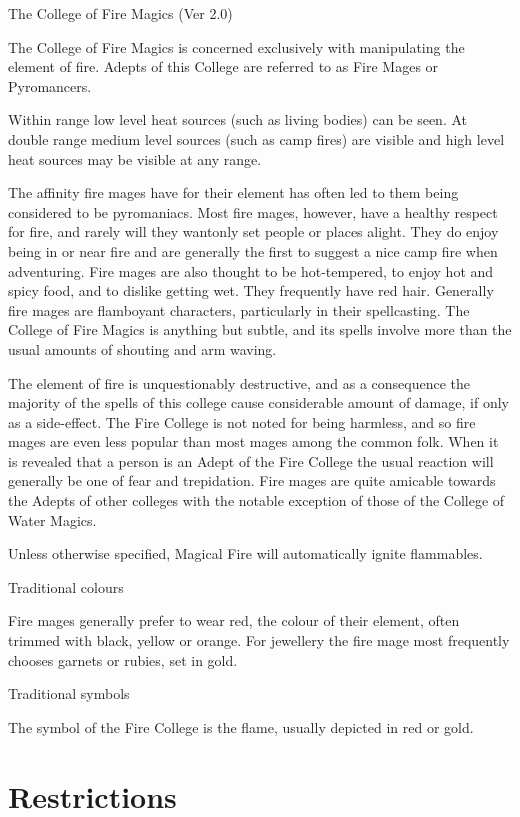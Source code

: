 \begin{Chapter}{The College of Fire Magics (Ver 2.0)}

The College of Fire Magics is concerned exclusively with manipulating
the element of fire.  Adepts of this College are referred to as Fire
Mages or Pyromancers.

Within range low level heat sources (such as living bodies) can be
seen. At double range medium level sources (such as camp fires) are
visible and high level heat sources may be visible at any range.

The affinity fire mages have for their element has often led to them
being considered to be pyromaniacs.  Most fire mages, however, have a
healthy respect for fire, and rarely will they wantonly set people or
places alight. They do enjoy being in or near fire and are generally
the first to suggest a nice camp fire when adventuring.  Fire mages
are also thought to be hot-tempered, to enjoy hot and spicy food, and
to dislike getting wet.  They frequently have red hair.  Generally
fire mages are flamboyant characters, particularly in their
spellcasting. The College of Fire Magics is anything but subtle, and
its spells involve more than the usual amounts of shouting and arm
waving.

The element of fire is unquestionably destructive, and as a
consequence the majority of the spells of this college cause
considerable amount of damage, if only as a side-effect.  The Fire
College is not noted for being harmless, and so fire mages are even
less popular than most mages among the common folk. When it is
revealed that a person is an Adept of the Fire College the usual
reaction will generally be one of fear and trepidation.  Fire mages
are quite amicable towards the Adepts of other colleges with the
notable exception of those of the College of Water Magics.

Unless otherwise specified, Magical Fire will automatically ignite
flammables.

Traditional colours 

Fire mages generally prefer to wear red, the colour of their element,
often trimmed with black, yellow or orange.  For jewellery the fire
mage most frequently chooses garnets or rubies, set in gold.

Traditional symbols 

The symbol of the Fire College is the flame, usually depicted in red
or gold.

\section{Restrictions}


\end{Chapter}
